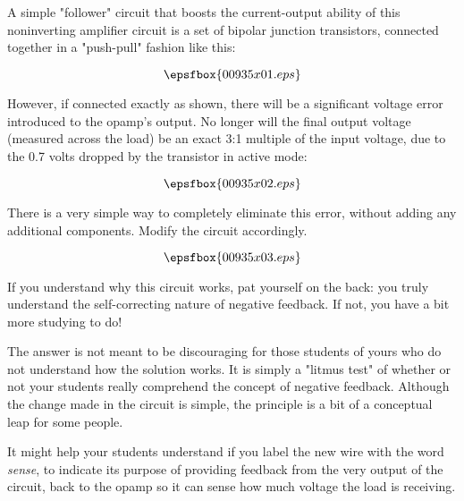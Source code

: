 

A simple "follower" circuit that boosts the current-output ability of this noninverting amplifier circuit is a set of bipolar junction transistors, connected together in a "push-pull" fashion like this:

$$\epsfbox{00935x01.eps}$$

However, if connected exactly as shown, there will be a significant voltage error introduced to the opamp's output.  No longer will the final output voltage (measured across the load) be an exact 3:1 multiple of the input voltage, due to the 0.7 volts dropped by the transistor in active mode:

$$\epsfbox{00935x02.eps}$$

There is a very simple way to completely eliminate this error, without adding any additional components.  Modify the circuit accordingly.







$$\epsfbox{00935x03.eps}$$

If you understand why this circuit works, pat yourself on the back: you truly understand the self-correcting nature of negative feedback.  If not, you have a bit more studying to do!







The answer is not meant to be discouraging for those students of yours who do not understand how the solution works.  It is simply a "litmus test" of whether or not your students really comprehend the concept of negative feedback.  Although the change made in the circuit is simple, the principle is a bit of a conceptual leap for some people.  

It might help your students understand if you label the new wire with the word {\it sense}, to indicate its purpose of providing feedback from the very output of the circuit, back to the opamp so it can sense how much voltage the load is receiving.




